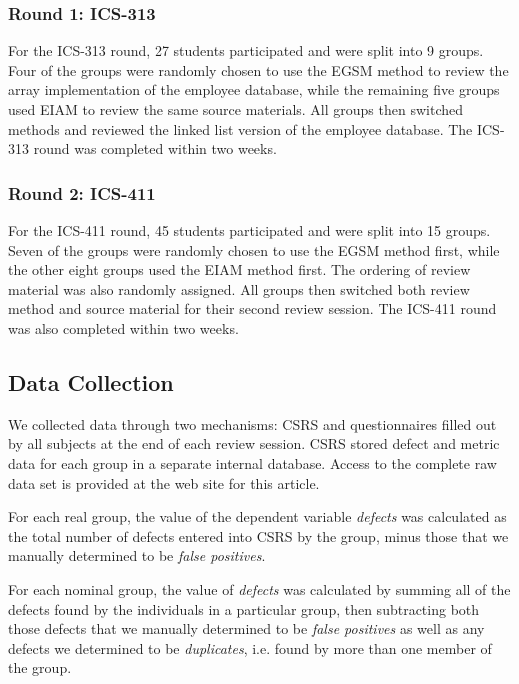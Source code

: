 \subsubsection{Round 1: ICS-313}

For the ICS-313 round, 27 students participated and were split into 9
groups. Four of the groups were randomly chosen to use the EGSM method to
review the array implementation of the employee database, while the remaining
five groups used EIAM to review the same source materials.  All groups then
switched methods and reviewed the linked list version of the employee
database. The ICS-313 round was completed within two weeks. 

\subsubsection{Round 2: ICS-411}

For the ICS-411 round, 45 students participated and were split into 15
groups. Seven of the groups were randomly chosen to use the EGSM method
first, while the other eight groups used the EIAM method first.  The 
ordering of review material was also randomly assigned.  All groups
then switched both review method and source material for their second
review session. The ICS-411 round was also completed within two weeks. 

\subsection{Data Collection}

We collected data through two mechanisms: CSRS and questionnaires filled
out by all subjects at the end of each review session.  CSRS stored
defect and metric data for each group in a separate internal database.
Access to the complete raw data set is provided at the web site 
for this article. 

For each real group, the value of the dependent variable {\em defects} was
calculated as the total number of defects entered into CSRS by the group,
minus those that we manually determined to be {\em false positives}.

For each nominal group, the value of {\em defects} was calculated by summing
all of the defects found by the individuals in a particular group, then
subtracting both those defects that we manually determined to be {\em false
  positives} as well as any defects we determined to be {\em duplicates},
i.e. found by more than one member of the group. 

